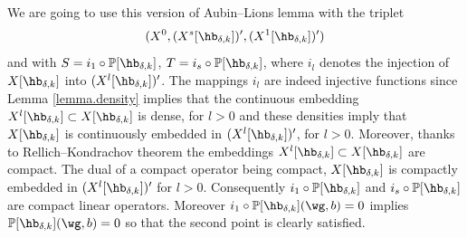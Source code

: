 \Changel
We are going to use this version of Aubin--Lions lemma with the triplet
\[
(X^0,(X^{s}[\hb_{\delta, k}])',(X^{1}[\hb_{\delta, k}])')
\]
and with $S= i_1\circ \mathbb{P}[\hb_{\delta, k}]$, $T=i_s\circ \mathbb{P}[\hb_{\delta, k}]$, where $i_l$ denotes the injection of $X[\hb_{\delta, k}]$ into $(X^{l}[\hb_{\delta, k}])'$. The mappings $i_l$ are indeed injective functions since Lemma \ref{lemma.density} implies that the continuous embedding $X^l[\hb_{\delta,k}] \subset X[\hb_{\delta, k}]$ is dense, for $l>0$ and these densities imply that $X[\hb_{\delta, k}]$ is continuously embedded in $(X^{l}[\hb_{\delta, k}])'$, for $l>0$. Moreover, thanks to Rellich--Kondrachov theorem the embeddings $X^l[\hb_{\delta,k}] \subset X[\hb_{\delta, k}]$ are compact. The dual of a compact operator being compact, $X[\hb_{\delta, k}] $ is compactly embedded in $(X^{l}[\hb_{\delta, k}])'$ for $l>0$. Consequently $i_1\circ \mathbb{P}[\hb_{\delta, k}]$ and $i_s\circ \mathbb{P}[\hb_{\delta, k}]$ are compact linear operators. Moreover $i_1\circ \mathbb{P}[\hb_{\delta, k}](\wg, b)=0$ implies $\mathbb{P}[\hb_{\delta, k}](\wg, b)=0$ so that the second point is clearly satisfied.
\Changelback


